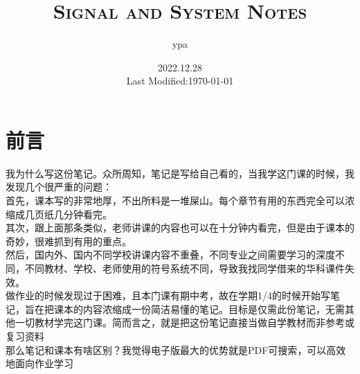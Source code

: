 \documentclass{article}
\title{\textsc{Signal and System Notes}}
\author{ypa}
\date{2022.12.28\\%
Last Modified:\today}
\begin{document}
\maketitle
\section{前言}
\noindent 我为什么写这份笔记。众所周知，笔记是写给自己看的，当我学这门课的时候，我发现几个很严重的问题：\\
首先，课本写的非常地厚，不出所料是一堆{\red 屎山}。每个章节有用的东西完全可以浓缩成几页纸几分钟看完。\\
其次，跟上面那条类似，老师讲课的内容也可以在十分钟内看完，但是由于课本的奇妙，很难抓到有用的重点。\\
然后，国内外、国内不同学校{\red 讲课内容不重叠}，不同专业之间需要学习的深度不同，不同教材、学校、老师使用的符号系统不同，导致我找同学借来的华科课件失效。\\
做作业的时候发现过于困难，且本门课有期中考，故在学期1/4的时候开始写笔记，旨在把课本的内容浓缩成一份简洁易懂的笔记。目标是{\red 仅需}此份笔记，无需其他一切教材学完这门课。简而言之，就是把这份笔记直接当做{\red 自学教材}而非参考或复习资料\\
那么笔记和课本有啥区别？我觉得电子版最大的优势就是{\red PDF可搜索}，可以高效地{\red 面向作业学习}

\end{document}
